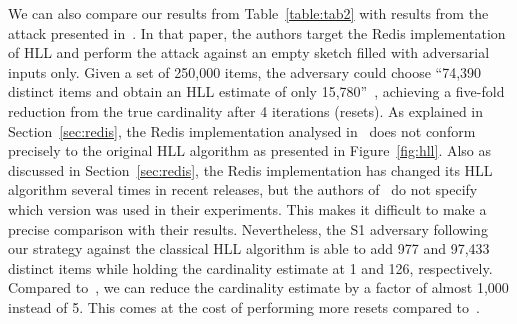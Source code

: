 \documentclass{article}
\begin{document}
We can also compare our results from Table~\ref{table:tab2} with results from the attack presented in~\cite[Section 5.1]{hllvuln}. In that paper, the authors target the Redis implementation of HLL and perform the attack against an empty sketch filled with adversarial inputs only. Given a set of 250,000 items, the adversary could choose ``74,390 distinct items and obtain an HLL estimate of only 15,780''~\cite{hllvuln}, achieving a five-fold reduction from the true cardinality after 4 iterations (resets). As explained in Section~\ref{sec:redis}, the Redis implementation analysed in~\cite{hllvuln} does not conform precisely to the original HLL algorithm as presented in Figure~\ref{fig:hll}. Also as discussed in Section~\ref{sec:redis}, the Redis implementation has changed its HLL algorithm several times in recent releases, but the authors of~\cite{hllvuln} do not specify which version was used in their experiments. This makes it difficult to make a precise comparison with their results. Nevertheless, the S1 adversary following our strategy against the classical HLL algorithm is able to add 977 and 97,433 distinct items while holding the cardinality estimate at 1 and 126, respectively. Compared to~\cite{hllvuln}, we can reduce the cardinality estimate by a factor of almost 1,000 instead of 5. This comes at the cost of performing more resets compared to~\cite{hllvuln}. 

\begin{table*}[tb!]
\small\centering
\caption{Attack results, averaged over 30 iterations.}
\medskip
\label{table:tab1}
\end{table*}
\end{document}
